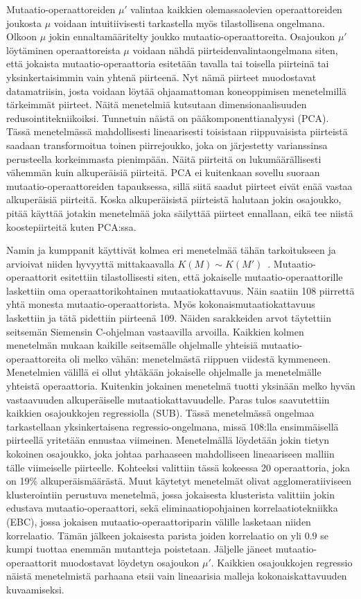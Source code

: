 \documentclass[finnish]{tktltiki2}
\begin{document}
Mutaatio-operaattoreiden $\mu'$ valintaa kaikkien olemassaolevien operaattoreiden joukosta $\mu$ voidaan intuitiivisesti tarkastella myös tilastollisena ongelmana. Olkoon $\mu$ jokin ennaltamääritelty joukko mutaatio-operaattoreita. Osajoukon $\mu'$ löytäminen operaattoreista $\mu$ voidaan nähdä piirteidenvalintaongelmana siten, että jokaista mutaatio-operaattoria esitetään tavalla tai toisella piirteinä tai yksinkertaisimmin vain yhtenä piirteenä. Nyt nämä piirteet muodostavat datamatriisin, josta voidaan löytää ohjaamattoman koneoppimisen menetelmillä tärkeimmät piirteet. Näitä menetelmiä kutsutaan dimensionaalisuuden redusointitekniikoiksi. Tunnetuin näistä on pääkomponenttianalyysi (PCA). Tässä menetelmässä mahdollisesti lineaarisesti toisistaan riippuvaisista piirteistä saadaan transformoitua toinen piirrejoukko, joka on järjestetty varianssinsa perusteella korkeimmasta pienimpään. Näitä piirteitä on lukumäärällisesti vähemmän kuin alkuperäisiä piirteitä. PCA ei kuitenkaan sovellu suoraan mutaatio-operaattoreiden tapauksessa, sillä siitä saadut piirteet eivät enää vastaa alkuperäisiä piirteitä. Koska alkuperäisistä piirteistä halutaan jokin osajoukko, pitää käyttää jotakin menetelmää joka säilyttää piirteet ennallaan, eikä tee niistä koostepiirteitä kuten PCA:ssa. 

Namin ja kumppanit käyttivät kolmea eri menetelmää tähän tarkoitukseen ja arvioivat niiden hyvyyttä mittakaavalla $K(M) \sim K(M')$~\cite{NaminA06}. Mutaatio-operaattorit esitettiin tilastollisesti siten, että jokaiselle mutaatio-operaattorille laskettiin oma operaattorikohtainen mutaatiokattavuus. Näin saatiin 108 piirrettä yhtä monesta mutaatio-operaattorista. Myös kokonaismutaatiokattavuus laskettiin ja tätä pidettiin piirteenä 109. Näiden sarakkeiden arvot täytettiin seitsemän Siemensin C-ohjelman vastaavilla arvoilla. Kaikkien kolmen menetelmän mukaan kaikille seitsemälle ohjelmalle yhteisiä mutaatio-operaattoreita oli melko vähän: menetelmästä riippuen viidestä kymmeneen. Menetelmien välillä ei ollut yhtäkään jokaiselle ohjelmalle ja menetelmälle yhteistä operaattoria. Kuitenkin jokainen menetelmä tuotti yksinään melko hyvän vastaavuuden alkuperäiselle mutaatiokattavuudelle. Paras tulos saavutettiin kaikkien osajoukkojen regressiolla (SUB). Tässä menetelmässä ongelmaa tarkastellaan yksinkertaisena regressio-ongelmana, missä 108:lla ensimmäisellä piirteellä yritetään ennustaa viimeinen. Menetelmällä löydetään jokin tietyn kokoinen osajoukko, joka johtaa parhaaseen mahdolliseen lineaariseen malliin tälle viimeiselle piirteelle. Kohteeksi valittiin tässä kokeessa 20 operaattoria, joka on 19\% alkuperäismäärästä. Muut käytetyt menetelmät olivat agglomeratiiviseen klusterointiin perustuva menetelmä, jossa jokaisesta klusterista valittiin jokin edustava mutaatio-operaattori, sekä eliminaatiopohjainen korrelaatiotekniikka (EBC), jossa jokaisen mutaatio-operaattoriparin välille lasketaan niiden korrelaatio. Tämän jälkeen jokaisesta parista joiden korrelaatio on yli $0.9$ se kumpi tuottaa enemmän mutantteja poistetaan. Jäljelle jäneet mutaatio-operaattorit muodostavat löydetyn osajoukon $\mu'$. Kaikkien osajoukkojen regressio näistä menetelmistä parhaana etsii vain lineaarisia malleja kokonaiskattavuuden kuvaamiseksi. 
\end{document}
